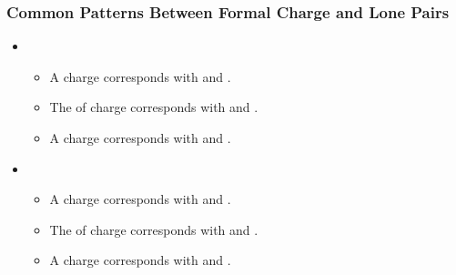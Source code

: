 \documentclass{inVerba-notes}
\begin{document}
\begin{itemize}
  \subsubsection{Common Patterns Between Formal Charge and Lone Pairs}
    \begin{itemize}
        \item {}
            \begin{itemize}
                \item A  charge corresponds with  and .
                \item The  of charge corresponds with  and .
                \item A  charge corresponds with  and .
            \end{itemize}
        \item {}
            \begin{itemize}
                \item A  charge corresponds with  and .
                \item The  of charge corresponds with  and .
                \item A  charge corresponds with  and .
            \end{itemize}
    \end{itemize}


\end{itemize}
\end{document}
